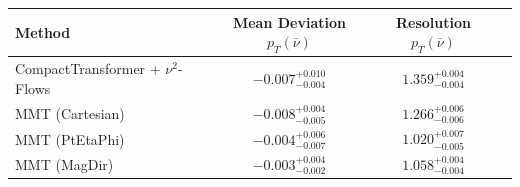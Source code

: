     \begin{tabular}{lccc}
        \toprule
        Method & Mean Deviation $p_{T}(\bar{\nu})$ & Resolution $p_{T}(\bar{\nu})$ \\
        \midrule
        CompactTransformer + $\nu^2$-Flows & $-0.007^{+0.010}_{-0.004}$ & $1.359^{+0.004}_{-0.004}$ \\
        MMT (Cartesian) & $-0.008^{+0.004}_{-0.005}$ & $1.266^{+0.006}_{-0.006}$ \\
        MMT (PtEtaPhi) & $-0.004^{+0.006}_{-0.007}$ & $1.020^{+0.007}_{-0.005}$ \\
        MMT (MagDir) & $-0.003^{+0.004}_{-0.002}$ & $1.058^{+0.004}_{-0.004}$ \\
        \bottomrule
    \end{tabular}